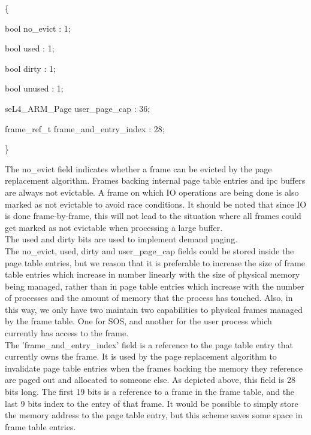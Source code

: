 \noindent
\{ \par
    bool no\_evict : 1; \par
    bool used : 1; \par
    bool dirty : 1; \par
    bool unused : 1; \par
    seL4\_ARM\_Page user\_page\_cap : 36; \par
    frame\_ref\_t frame\_and\_entry\_index : 28; \par 
    \noindent
\}

\noindent
The no\_evict field indicates whether a frame can be evicted by the
page replacement algorithm. Frames backing internal page table entries
and ipc buffers are always not evictable. A frame on which IO operations
are being done is also marked as not evictable to avoid race conditions.
It should be noted that since IO is done frame-by-frame, this will not
lead to the situation where all frames could get marked as not evictable
when processing a large buffer.
\\

\noindent
The used and dirty bits are used to implement demand paging.
\\

\noindent
The no\_evict, used, dirty and user\_page\_cap fields could be stored
inside the page table entries, but we reason that it is preferable to 
increase the size of frame table entries which increase in number
linearly with the size of physical memory being managed, rather than
in page table entries which increase with the number of processes and
the amount of memory that the process has touched. Also, in this way, 
we only have two maintain two capabilities to physical frames managed by
the frame table. One for SOS, and another for the user process which
currently has access to the frame.
\\

\noindent
The 'frame\_and\_entry\_index' field is a reference to the page table entry that
currently owns the frame. It is used by the page replacement algorithm
to invalidate page table entries when the frames backing the memory they reference
are paged out and allocated to someone else. 
As depicted above, this field is 28 bits long. The first
19 bits is a reference to a frame in the frame table, and the last 9 bits
index to the entry of that frame. It would be possible to simply store
the memory address to the page table entry, but this scheme saves
some space in frame table entries.
\\

